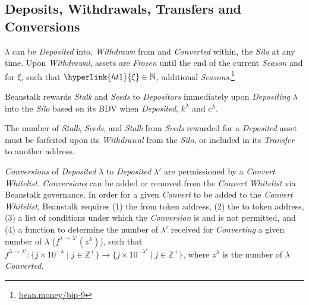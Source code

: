 \documentclass[tikz]{article}
\newcommand{\term}[1]{\textsl{#1}}
\begin{document}
\vspace*{-1mm}
\subsection{Deposits, Withdrawals, Transfers and Conversions}
\vspace*{-1mm}
\hyperlink{ht126}{$\lambda$} can be \term{Deposited} into, \term{Withdrawn} from and \term{Converted} within, the \term{Silo} at any time. Upon \term{Withdrawal}, assets are \term{Frozen} until the end of the current \term{Season} and for \hyperlink{ht1}{$\xi$}, such that $\hyperlink{ht1}{\xi} \in \mathbb{N}$, additional \term{Seasons}.\footnote{\href{https://bean.money/bip-9}{bean.money/bip-9}}

Beanstalk rewards \term{Stalk} and \term{Seeds} to \term{Depositors} immediately upon \term{Depositing} \hyperlink{ht126}{$\lambda$} into the \term{Silo} based on its BDV when \term{Deposited}, \hyperlink{ht120}{$k^{\lambda}$} and \hyperlink{ht32}{$c^{\lambda}$}.

The number of \term{Stalk}, \term{Seeds}, and \term{Stalk} from \term{Seeds} rewarded for a \term{Deposited} asset must be forfeited upon its \term{Withdrawal} from the \term{Silo}, or included in its \term{Transfer} to another address. 

\term{Conversions} of \term{Deposited} \hyperlink{ht126}{$\lambda$} to \term{Deposited} $\lambda'$ are permissioned by a \term{Convert} \term{Whitelist}. \term{Conversions} can be added or removed from the \term{Convert} \term{Whitelist} via Beanstalk governance. In order for a given \term{Convert} to be added to the \term{Convert} \term{Whitelist}, Beanstalk requires (1) the from token address, (2) the to token address, (3) a list of conditions under which the \term{Conversion} is and is not permitted, and (4) a function to determine the number of $\lambda'$ received for \term{Converting} a given number of \hyperlink{ht126}{$\lambda$} ($f^{\lambda \rightarrow \lambda'}(z^{\lambda})$), such that $f^{\lambda \rightarrow \lambda'}\colon \{j \times 10^{-\lambda} \mid j \in \mathbb{Z}^{+} \} \rightarrow \{j \times 10^{-\lambda'} \mid j \in \mathbb{Z}^{+} \}$, where $z^{\lambda}$ is the number of \hyperlink{ht126}{\hyperlink{ht126}{$\lambda$}} \term{Converted}. 
\end{document}
